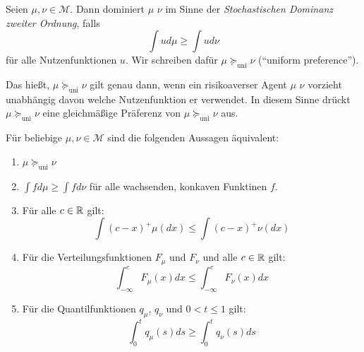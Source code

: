 \documentclass[a4paper,twoside,DIV15,BCOR12mm]{scrbook}
\newcommand{\cM}{\mathcal M}
\newcommand{\unisucceq}{\succeq_{\text{uni}}}
\begin{document}
\begin{definition}
Seien $\mu,\nu\in\cM$. Dann dominiert $\mu$ $\nu$ im Sinne der \emph{Stochastischen Dominanz zweiter Ordnung}, falls 
\[
\int u d\mu \ge \int u d\nu
\]
für alle Nutzenfunktionen $u$. Wir schreiben dafür $\mu \unisucceq \nu$ (“uniform preference”).
\end{definition}

Das hießt, $\mu \unisucceq \nu$ gilt genau dann, wenn ein risikoaverser Agent $\mu$ $\nu$ vorzieht unabhängig davon welche Nutzenfunktion er verwendet. In diesem Sinne drückt $\mu\unisucceq \nu$ eine gleichmäßige Präferenz von $\mu\unisucceq\nu$ aus.

\begin{satz}
\label{satz:1.3.2}Für beliebige $\mu,\nu\in\cM$ sind die folgenden Aussagen äquivalent:
\begin{enumerate}
\item $\mu\unisucceq \nu$
\item $\int fd\mu \ge \int f d\nu$ für alle wachsenden, konkaven Funktinen $f$.
\item Für alle $c\in\mathbb{R}$ gilt:
\[
\int (c-x)^+\mu(dx) \le \int (c-x)^+\nu(dx)
\]
\item Für die Verteilungsfunktionen $F_\mu$ und $F_\nu$ und alle $c\in\mathbb{R}$ gilt:
\[
\int_{-\infty}^c F_{\mu}(x) dx \le \int_{-\infty}^c F_{\nu}(x) dx 
\]
\item Für die Quantilfunktionen $q_\mu$, $q_\nu$ und $0<t\le 1$ gilt:
\[
\int_0^t q_\mu(s)ds \ge \int_0^t q_\nu(s)ds
\]
\end{enumerate}
\end{satz}
\end{document}
